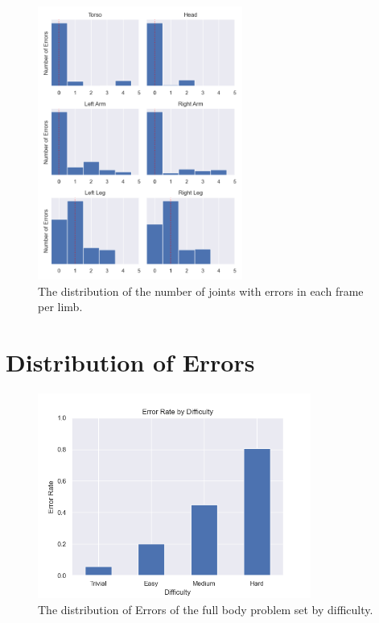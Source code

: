 \begin{figure}
  \centering
  \includegraphics[width=0.6\textwidth]{figures/Data/joint_errors_per_pose/distribution_of_joint_errors_per_pose_per_body_part.png}
  \caption[Number of Joints with error per limb]{The distribution of the number of joints with errors in each frame per limb.}
  \label{fig:dist_lb_epp}
\end{figure}

\section{Distribution of Errors}

\begin{figure}
  \centering
  \includegraphics[width=0.8\textwidth]{figures/Data/dist_full_body/Error_Rate_by_Difficulty.png}
  \caption[Error Distribution of the Full Body by difficulty]{The distribution of Errors of the full body problem set by difficulty.}
  \label{fig:fb_diff_dist}
\end{figure}

